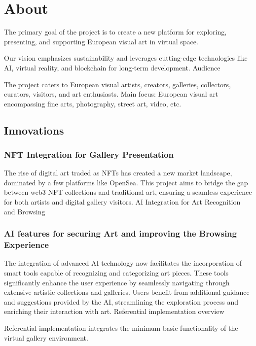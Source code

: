 \newcommand{\SubItem}[1]{
    {\setlength\itemindent{15pt} \item[-] #1}
}

\chapter{About}
The primary goal of the project is to create a new platform for exploring, presenting, and supporting European visual art in virtual space.

Our vision emphasizes sustainability and leverages cutting-edge technologies like AI, virtual reality, and blockchain for long-term development.
Audience

The project caters to European visual artists, creators, galleries, collectors, curators, visitors, and art enthusiasts. Main focus: European visual art encompassing fine arts, photography, street art, video, etc.

\section{Innovations}
\subsection[NFT]{NFT Integration for Gallery Presentation}
The rise of digital art traded as NFTs has created a new market landscape, dominated by a few platforms like OpenSea. This project aims to bridge the gap between web3 NFT collections and traditional art, ensuring a seamless experience for both artists and digital gallery visitors.
AI Integration for Art Recognition and Browsing

\subsection[AI]{AI features for securing Art and improving the Browsing Experience}
The integration of advanced AI technology now facilitates the incorporation of smart tools capable of recognizing and categorizing art pieces. These tools significantly enhance the user experience by seamlessly navigating through extensive artistic collections and galleries. Users benefit from additional guidance and suggestions provided by the AI, streamlining the exploration process and enriching their interaction with art.
Referential implementation overview

Referential implementation integrates the minimum basic functionality of the virtual gallery environment.

